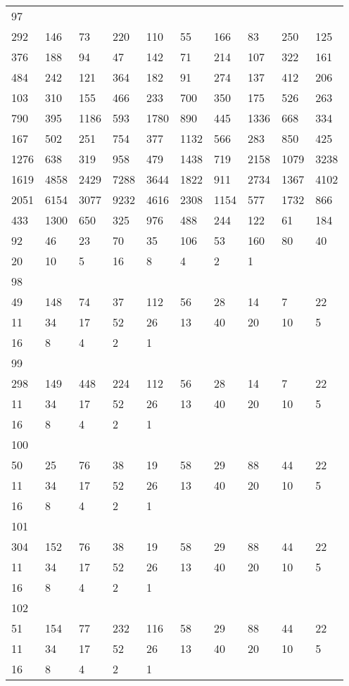 \begin{longtable}{*{10}{l}}
97&&&&&&&&&\\
292& 146& 73& 220& 110& 55& 166& 83& 250& 125\\
376& 188& 94& 47& 142& 71& 214& 107& 322& 161\\
484& 242& 121& 364& 182& 91& 274& 137& 412& 206\\
103& 310& 155& 466& 233& 700& 350& 175& 526& 263\\
790& 395& 1186& 593& 1780& 890& 445& 1336& 668& 334\\
167& 502& 251& 754& 377& 1132& 566& 283& 850& 425\\
1276& 638& 319& 958& 479& 1438& 719& 2158& 1079& 3238\\
1619& 4858& 2429& 7288& 3644& 1822& 911& 2734& 1367& 4102\\
2051& 6154& 3077& 9232& 4616& 2308& 1154& 577& 1732& 866\\
433& 1300& 650& 325& 976& 488& 244& 122& 61& 184\\
92& 46& 23& 70& 35& 106& 53& 160& 80& 40\\
20& 10& 5& 16& 8& 4& 2& 1& \\

98&&&&&&&&&\\
49& 148& 74& 37& 112& 56& 28& 14& 7& 22\\
11& 34& 17& 52& 26& 13& 40& 20& 10& 5\\
16& 8& 4& 2& 1& \\

99&&&&&&&&&\\
298& 149& 448& 224& 112& 56& 28& 14& 7& 22\\
11& 34& 17& 52& 26& 13& 40& 20& 10& 5\\
16& 8& 4& 2& 1& \\

100&&&&&&&&&\\
50& 25& 76& 38& 19& 58& 29& 88& 44& 22\\
11& 34& 17& 52& 26& 13& 40& 20& 10& 5\\
16& 8& 4& 2& 1& \\

101&&&&&&&&&\\
304& 152& 76& 38& 19& 58& 29& 88& 44& 22\\
11& 34& 17& 52& 26& 13& 40& 20& 10& 5\\
16& 8& 4& 2& 1& \\

102&&&&&&&&&\\
51& 154& 77& 232& 116& 58& 29& 88& 44& 22\\
11& 34& 17& 52& 26& 13& 40& 20& 10& 5\\
16& 8& 4& 2& 1& \\


\end{longtable}
